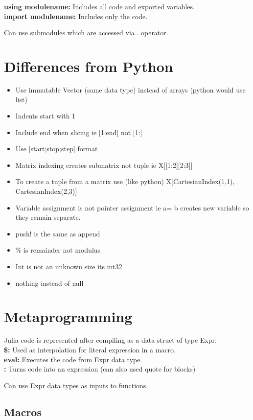 \documentclass[11pt]{scrartcl} %
\begin{document}
\textbf{using modulename:} Includes all code and exported variables.\\
\textbf{import modulename:} Includes only the code.

Can use submodules which are accessed via . operator.

\section{Differences from Python}

\begin{itemize}
	\item Use immutable Vector (same data type) instead of arrays (python would use list)
	\item Indents start with 1
	\item Include end when slicing ie [1:end] not [1:]
	\item Use [start;stop;step] format
	\item Matrix indexing creates submatrix not tuple ie X[[1:2][2:3]]
	\item To create a tuple from a matrix use (like python) X[CartesianIndex(1,1), CartesianIndex(2,3)]
	\item Variable assignment is not pointer assignment ie a= b creates new variable so they remain separate.
	\item push! is the same as append
	\item \% is remainder not modulus
	\item Int is not an unknown size its int32
	\item nothing instead of null
\end{itemize}

\section{Metaprogramming}

Julia code is represented after compiling as a data struct of type Expr.\\

\textbf{\$:} Used as interpolation for literal expression in a macro.\\
\textbf{eval:} Executes the code from Expr data type.\\
\textbf{:} Turns code into an expression (can also used quote for blocks)

Can use Expr data types as inputs to functions.

\subsection{Macros}
\end{document}
